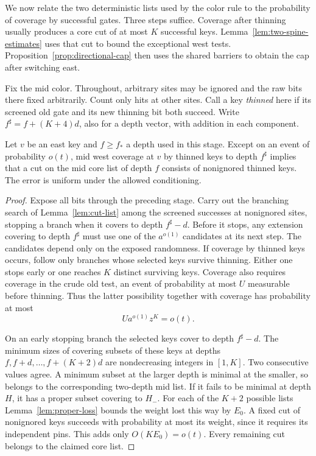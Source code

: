 We now relate the two deterministic lists used by the color rule to
the probability of coverage by successful gates. Three steps suffice.
Coverage after thinning usually produces a core cut of at most \(K\)
successful keys. Lemma~\ref{lem:two-spine-estimates} uses that cut to
bound the exceptional west tests. Proposition~\ref{prop:directional-cap}
then uses the shared barriers to obtain the cap after switching east.

Fix the mid color. Throughout, arbitrary sites may be ignored and
the raw bits there fixed arbitrarily. Count only hits at other sites.
Call a key \emph{thinned} here if its screened old gate and its new
thinning bit both succeed. Write \(f^\sharp=f+(K+4)d\), also for a
depth vector, with addition in each component.

\begin{lemma}\label{lem:thinned-cover}
Let \(v\) be an east key and \(f\ge f_*\) a depth used in this stage.
Except on an event of probability \(o(t)\), mid west coverage at
\(v\) by thinned keys to depth \(f^\sharp\) implies that a cut on the
mid core list of depth \(f\) consists of nonignored thinned keys.
The error is uniform under the allowed conditioning.
\end{lemma}

\begin{proof}
Expose all bits through the preceding stage. Carry out the branching
search of Lemma~\ref{lem:cut-list} among the screened successes at
nonignored sites, stopping a branch when it covers to depth
\(f^\sharp-d\). Before it stops, any extension covering to depth
\(f^\sharp\) must use one of the \(a^{o(1)}\) candidates at its next
step. The candidates depend only on the exposed randomness. If
coverage by thinned keys occurs, follow only branches whose selected
keys survive thinning. Either one stops early or one reaches \(K\)
distinct surviving keys. Coverage also requires coverage in the crude
old test, an event of probability at most \(U\) measurable before
thinning. Thus the latter possibility together with coverage has
probability at most
\[
 Ua^{o(1)}z^K=o(t).
\]

On an early stopping branch the selected keys cover to depth
\(f^\sharp-d\). The minimum sizes of covering subsets of these keys
at depths \(f,f+d,\ldots,f+(K+2)d\) are nondecreasing integers in
\([1,K]\). Two consecutive values agree. A minimum subset at the
larger depth is minimal at the smaller, so belongs to the corresponding
two-depth mid list. If it fails to be minimal at depth \(H\), it has
a proper subset covering to \(H_-\). For each of the \(K+2\) possible
lists Lemma~\ref{lem:proper-loss} bounds the weight lost this way by
\(E_0\). A fixed cut of nonignored keys succeeds with probability at
most its weight, since it requires its independent pins. This adds
only \(O(KE_0)=o(t)\). Every remaining cut belongs to the claimed
core list.
\end{proof}

